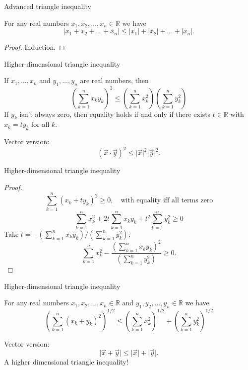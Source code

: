 \documentclass{beamer}
\begin{document}
\begin{frame}{Advanced triangle inequality}
\begin{thm}
For any real numbers $x_1,x_2,\dots,x_n\in\mathbb{R}$ we have
$$\lvert x_1+x_2+\dots+x_n\rvert\leq \lvert x_1 \rvert + \lvert x_2\rvert +  \dots + \lvert x_n\rvert.$$
\end{thm}
\pause
\begin{proof}
Induction.
\end{proof}
\end{frame}

\begin{frame}{Higher-dimensional triangle inequality}
\begin{thm}
If $x_1,\dots,x_n$ and $y_1,\dots, y_n$ are real numbers, then
$$\left(\sum_{k=1}^n x_ky_k\right)^2\leq \left(\sum_{k=1}^n x_k^2\right)\left(\sum_{k=1}^n y_k^2\right)$$
If $y_k$ isn't always zero, then equality holds if and only if there exists $t\in\mathbb{R}$ with $x_k = ty_k$ for all $k$.
\end{thm}
\pause
Vector version:
$$(\vec x\cdot\vec y)^2 \leq \lvert \vec x\rvert^2\lvert \vec y\rvert^2.$$
\end{frame}

\begin{frame}{Higher-dimensional triangle inequality}
\begin{proof}
\pause
$$\sum_{k=1}^n (x_k + ty_k)^2\geq 0,\quad \text{with equality iff all terms zero}$$
\pause
$$\sum_{k=1}^n x_k^2 + 2t\sum_{k=1}^n x_ky_k + t^2\sum_{k=1}^ny_k^2\geq 0$$
\pause
Take $t = -\left(\sum_{k=1}^n x_ky_k\right)/\left(\sum_{k=1}^ny_k^2\right):$
\pause
$$\sum_{k=1}^n x_k^2 -\frac{ \left(\sum_{k=1}^n x_ky_k\right)^2}{\left(\sum_{k=1}^ny_k^2\right)}\geq 0.$$
\end{proof}
\end{frame}

\begin{frame}{Higher-dimensional triangle inequality}
\begin{thm}
For any real numbers $x_1,x_2,\dots,x_n\in\mathbb{R}$ and $y_1,y_2,\dots,y_n\in\mathbb{R}$ we have
$$\left(\sum_{k=1}^n (x_k+y_k)^2\right)^{1/2}\leq \left(\sum_{k=1}^n x_k^2\right)^{1/2} + \left(\sum_{k=1}^ny_k^2\right)^{1/2}$$
\end{thm}
\pause
Vector version:
$$\lvert \vec x+\vec y\rvert \leq \lvert \vec x\rvert + \lvert\vec y\rvert.$$
\pause
A higher dimensional triangle inequality!
\end{frame}
\end{document}
